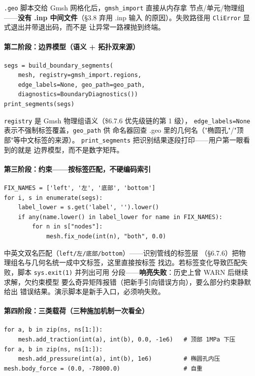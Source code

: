 \documentclass[12pt,a4paper]{ctexart}
\newcommand{\fem}{\Verb}
\begin{document}
\fem|.geo| 脚本交给 Gmsh 网格化后，\fem|gmsh_import| 直接从内存拿
节点/单元/物理组——\textbf{没有 .inp 中间文件}（§3.8 弃用 .inp 输入
的原因）。失败路径用 \fem|CliError| 显式退出并带退出码，而不是
让异常一路裸抛到终端。

\paragraph{第二阶段：边界模型（语义 + 拓扑双来源）}

\begin{lstlisting}
segs = build_boundary_segments(
    mesh, registry=gmsh_import.regions,
    edge_labels=None, geo_path=geo_path,
    diagnostics=BoundaryDiagnostics())
print_segments(segs)
\end{lstlisting}

\fem|registry| 是 Gmsh 物理组语义（\$6.7.6 优先级链的第 1 级），
\fem|edge_labels=None| 表示不强制标签覆盖，\fem|geo_path| 供
命名器回查 .geo 里的几何名（"椭圆孔"/"顶部"等中文标签的来源）。
\fem|print_segments| 把识别结果逐段打印——用户第一眼看到的就是
边界模型，而不是数字矩阵。

\paragraph{第三阶段：约束——按标签匹配，不硬编码索引}

\begin{lstlisting}
FIX_NAMES = ['left', '左', '底部', 'bottom']
for i, s in enumerate(segs):
    label_lower = s.get('label', '').lower()
    if any(name.lower() in label_lower for name in FIX_NAMES):
        for n in s["nodes"]:
            mesh.fix_node(int(n), "both", 0.0)
\end{lstlisting}

中英文双名匹配（\fem|left/左/底部/bottom|）——识别管线的标签层
（§6.7.6）把物理组名与几何名统一成中文标签，这里直接按标签
找边。若标签变化导致匹配失败，脚本 \fem|sys.exit(1)| 并列出可用
分段——\textbf{响亮失败}：历史上曾 WARN 后继续求解，欠约束模型
要么奇异矩阵报错（把新手引向错误方向），要么部分约束静默给出
错误结果。演示脚本是新手入口，必须响失败。

\paragraph{第四阶段：三类载荷（三种施加机制一次看全）}

\begin{lstlisting}
for a, b in zip(ns, ns[1:]):
    mesh.add_traction(int(a), int(b), 0.0, -1e6)   # 顶部 1MPa 下压
for a, b in zip(ns, ns[1:]):
    mesh.add_pressure(int(a), int(b), 1e6)         # 椭圆孔内压
mesh.body_force = (0.0, -78000.0)                  # 自重
\end{lstlisting}
\end{document}
